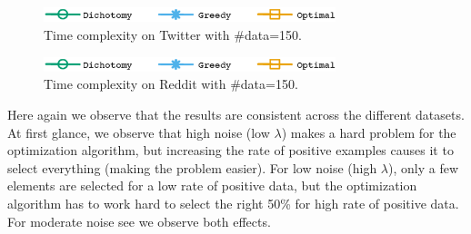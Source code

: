 \begin{figure}[H]
\begin{centering}
\includegraphics[width=8.5cm]{imgs/legend2}
\par\end{centering}
\begin{centering}
\par\end{centering}
\caption{Time complexity on Twitter with \#data=150.}
\label{fig:Time_vs_Pos_Twitter}
\end{figure}

\begin{figure}[H]
\begin{centering}
\includegraphics[width=8.5cm]{imgs/legend2}
\par\end{centering}
\begin{centering}
\par\end{centering}
\caption{Time complexity on Reddit with \#data=150.}
\label{fig:Time_vs_Pos_Reddit}
\end{figure}

Here again we observe that the results are consistent across the different datasets. 
At first glance, we observe that high noise (low $\lambda$) makes a hard problem for the optimization algorithm, but increasing the rate of positive examples causes it to select everything (making the problem easier).  For low noise (high $\lambda$), only a few elements are selected for a low rate of positive data, but the optimization algorithm has to work hard to select the right 50\% for high rate of positive data.  For moderate noise see we observe both effects.



